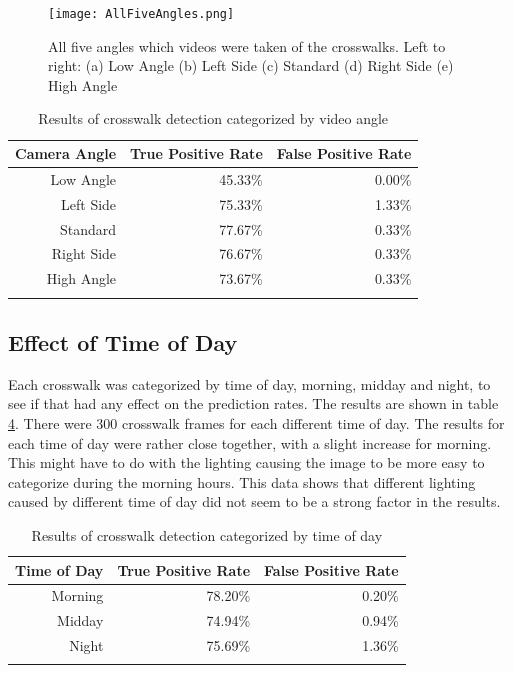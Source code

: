 \documentclass[12pt]{ucthesis}
\newcommand{\captionfonts}{\small\bf\ssp}
\begin{document}
\begin{figure}[t]
\begin{center}
\texttt{[image: AllFiveAngles.png]}
\captionfonts
\caption[All Five Different Crosswalk Angles]{All five angles which videos were taken of the crosswalks. Left to right: (a) Low Angle (b) Left Side (c) Standard (d) Right Side (e) High Angle}
\label{fig:AllFiveAngles}
\end{center}
\end{figure}

\begin{table}[t]
    \begin{longtable}{|r|r|r|}
    \hline
    Camera Angle & True Positive Rate & False Positive Rate \bigstrut\\
    \hline
    Low Angle & 45.33\% & 0.00\% \bigstrut\\
    \hline
    Left Side & 75.33\% & 1.33\% \bigstrut\\
    \hline
    Standard & 77.67\% & 0.33\% \bigstrut\\
    \hline
    Right Side & 76.67\% & 0.33\% \bigstrut\\
    \hline
    High Angle & 73.67\% & 0.33\% \bigstrut\\
    \hline

    \caption{Results of crosswalk detection categorized by video angle}
    \label{tab:downbad} 
    \end{longtable}
\end{table}

\clearpage

\subsection{Effect of Time of Day}
Each crosswalk was categorized by time of day, morning, midday and night, to see if that had any effect on the prediction rates. The results are shown in table \ref{tab:timeofday}. There were 300 crosswalk frames for each different time of day. The results for each time of day were rather close together, with a slight increase for morning. This might have to do with the lighting causing the image to be more easy to categorize during the morning hours. This data shows that different lighting caused by different time of day did not seem to be a strong factor in the results.

\begin{table}[t]
    \begin{longtable}{|r|r|r|}
    \hline
    Time of Day & True Positive Rate & False Positive Rate \bigstrut\\
    \hline
    Morning & 78.20\% & 0.20\% \bigstrut\\
    \hline
    Midday & 74.94\% & 0.94\% \bigstrut\\
    \hline
    Night & 75.69\% & 1.36\% \bigstrut\\
    \hline


    \caption{Results of crosswalk detection categorized by time of day}
    \label{tab:timeofday} 
    \end{longtable}
\end{table}
\end{document}
